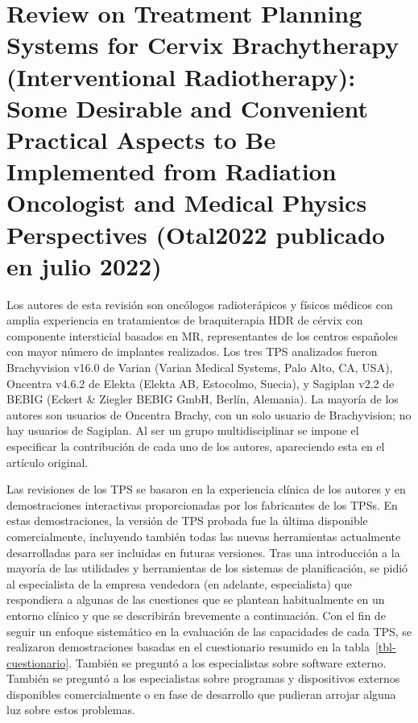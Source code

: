 \documentclass[
  a4paper,
]{scrreprt}
\begin{document}
\hypertarget{review-on-treatment-planning-systems-for-cervix-brachytherapy-interventional-radiotherapy-some-desirable-and-convenient-practical-aspects-to-be-implemented-from-radiation-oncologist-and-medical-physics-perspectives-otal2022-publicado-en-julio-2022}{%
\section{Review on Treatment Planning Systems for Cervix Brachytherapy
(Interventional Radiotherapy): Some Desirable and Convenient Practical
Aspects to Be Implemented from Radiation Oncologist and Medical Physics
Perspectives (Otal2022 publicado en julio
2022)}\label{review-on-treatment-planning-systems-for-cervix-brachytherapy-interventional-radiotherapy-some-desirable-and-convenient-practical-aspects-to-be-implemented-from-radiation-oncologist-and-medical-physics-perspectives-otal2022-publicado-en-julio-2022}}

Los autores de esta revisión son oncólogos radioterápicos y físicos
médicos con amplia experiencia en tratamientos de braquiterapia HDR de
cérvix con componente intersticial basados en MR, representantes de los
centros españoles con mayor número de implantes realizados. Los tres TPS
analizados fueron Brachyvision v16.0 de Varian (Varian Medical Systems,
Palo Alto, CA, USA), Oncentra v4.6.2 de Elekta (Elekta AB, Estocolmo,
Suecia), y Sagiplan v2.2 de BEBIG (Eckert \& Ziegler BEBIG GmbH, Berlín,
Alemania). La mayoría de los autores son usuarios de Oncentra Brachy,
con un solo usuario de Brachyvision; no hay usuarios de Sagiplan. Al ser
un grupo multidisciplinar se impone el especificar la contribución de
cada uno de los autores, apareciendo esta en el artículo original.

Las revisiones de los TPS se basaron en la experiencia clínica de los
autores y en demostraciones interactivas proporcionadas por los
fabricantes de los TPSs. En estas demostraciones, la versión de TPS
probada fue la última disponible comercialmente, incluyendo también
todas las nuevas herramientas actualmente desarrolladas para ser
incluidas en futuras versiones. Tras una introducción a la mayoría de
las utilidades y herramientas de los sistemas de planificación, se pidió
al especialista de la empresa vendedora (en adelante, especialista) que
respondiera a algunas de las cuestiones que se plantean habitualmente en
un entorno clínico y que se describirán brevemente a continuación. Con
el fin de seguir un enfoque sistemático en la evaluación de las
capacidades de cada TPS, se realizaron demostraciones basadas en el
cuestionario resumido en la tabla~\ref{tbl-cuestionario}. También se
preguntó a los especialistas sobre software externo. También se preguntó
a los especialistas sobre programas y dispositivos externos disponibles
comercialmente o en fase de desarrollo que pudieran arrojar alguna luz
sobre estos problemas.
\end{document}
